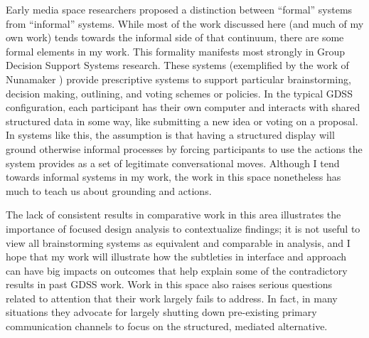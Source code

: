 Early media space researchers proposed a distinction between ``formal'' systems from ``informal'' systems. \citep{Olson:1991vz} While most of the work discussed here (and much of my own work) tends towards the informal side of that continuum, there are some formal elements in my work. This formality manifests most strongly in Group Decision Support Systems research. These systems (exemplified by the work of Nunamaker \citep{nunamaker_electronic_1991}) provide prescriptive systems to support particular brainstorming, decision making, outlining, and voting schemes or policies. In the typical GDSS configuration, each participant has their own computer and interacts with shared structured data in some way, like submitting a new idea or voting on a proposal. In systems like this, the assumption is that having a structured display will ground otherwise informal processes by forcing participants to use the actions the system provides as a set of legitimate conversational moves. Although I tend towards informal systems in my work, the work in this space nonetheless has much to teach us about grounding and actions. 

The lack of consistent results in comparative work in this area \citep{Dennis:1988ww} illustrates the importance of focused design analysis to contextualize findings; it is not useful to view all brainstorming systems as equivalent and comparable in analysis, and I hope that my work will illustrate how the subtleties in interface and approach can have big impacts on outcomes that help explain some of the contradictory results in past GDSS work. Work in this space also raises serious questions related to attention that their work largely fails to address. In fact, in many situations they advocate for largely shutting down pre-existing primary communication channels to focus on the structured, mediated alternative.


